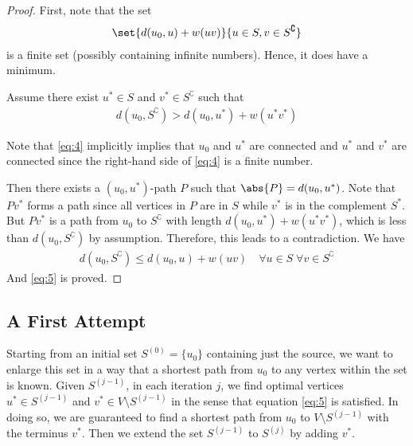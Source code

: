 \documentclass[thmcnt=section, 12pt, color=cyan]{my-elegantbook}
\begin{document}
\begin{proof}
    First, note that the set 
    \begin{align*}
        \set{d(u_0, u) + w(u v)}{u \in S, v \in S^\complement}
    \end{align*}
    is a finite set (possibly containing infinite numbers). Hence, it does have a minimum. 

    Assume there exist $u^\ast \in S$ and $v^\ast \in S^\complement$ such that 
    \begin{align}
        d(u_0, S^\complement)
        > d(u_0, u^\ast) + w(u^\ast v^\ast)
        \label{eq:4}
    \end{align}
    \begin{note}
        Note that \eqref{eq:4} implicitly implies that $u_0$ and $u^\ast$ are connected and $u^\ast$ and $v^\ast$ are connected since the right-hand side of \eqref{eq:4} is a finite number.
    \end{note}
    \noindent Then there exists a $(u_0, u^\ast)$-path $P$ such that $\abs{P} = d(u_0, u^\ast)$. Note that $P v^\ast$ forms a path since all vertices in $P$ are in $S$ while $v^\ast$ is in the complement $S^\ast$. But $P v^\ast$ is a path from $u_0$ to $S^\complement$ with length $d(u_0, u^\ast) + w(u^\ast v^\ast)$, which is less than $d(u_0, S^\complement)$ by assumption. Therefore, this leads to a contradiction. We have 
    \begin{align*}
        d(u_0, S^\complement)
        \leq d(u_0, u) + w(u v)
        \quad
        \forall u \in S \; 
        \forall v \in S^\complement
    \end{align*}
    And \eqref{eq:5} is proved.
\end{proof}


\subsection{A First Attempt}

Starting from an initial set $S^{(0)} = \{u_0\}$ containing just the source, we want to enlarge this set in a way that a shortest path from $u_0$ to any vertex within the set is known. Given $S^{(j-1)}$, in each iteration $j$, we find optimal vertices $u^\ast \in S^{(j-1)}$ and $v^\ast \in V \setminus S^{(j-1)}$ in the sense that equation \eqref{eq:5} is satisfied. In doing so, we are guaranteed to find a shortest path from $u_0$ to $V \setminus S^{(j-1)}$ with the terminus $v^\ast$. Then we extend the set $S^{(j-1)}$ to $S^{(j)}$ by adding $v^\ast$. 
\end{document}

